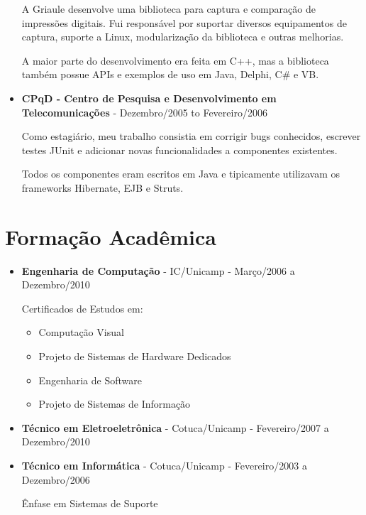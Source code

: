 \documentclass[a4paper,10pt]{article}
\begin{document}
\begin{itemize}
        A Griaule desenvolve uma biblioteca para captura e comparação de impressões digitais. Fui responsável por suportar diversos equipamentos de captura, suporte a Linux, modularização da biblioteca e outras melhorias.
        
        A maior parte do desenvolvimento era feita em C++, mas a biblioteca também possue APIs e exemplos de uso em Java, Delphi, C\# e VB.

      \item
        \textbf{CPqD - Centro de Pesquisa e Desenvolvimento em Telecomunicações} - Dezembro/2005 to Fevereiro/2006

        Como estagiário, meu trabalho consistia em corrigir bugs conhecidos, escrever testes JUnit e adicionar novas funcionalidades a componentes existentes.

        Todos os componentes eram escritos em Java e tipicamente utilizavam os frameworks Hibernate, EJB e Struts.
    \end{itemize}

  \section{Formação Acadêmica}
    \begin{itemize}
      \item  
        \textbf{Engenharia de Computação} - IC/Unicamp - Março/2006 a Dezembro/2010

        Certificados de Estudos em:
        \begin{itemize}
          \item Computação Visual
          \item Projeto de Sistemas de Hardware Dedicados
          \item Engenharia de Software
          \item Projeto de Sistemas de Informação
        \end{itemize}



      \item  
        \textbf{Técnico em Eletroeletrônica} - Cotuca/Unicamp - Fevereiro/2007 a Dezembro/2010


      \item  
        \textbf{Técnico em Informática} - Cotuca/Unicamp - Fevereiro/2003 a Dezembro/2006

        Ênfase em Sistemas de Suporte


    \end{itemize}
    
\end{document}
